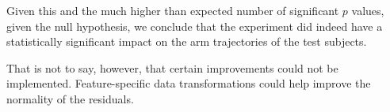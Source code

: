 \documentclass[11pt,fleqn]{article}
\begin{document}
Given this and the much higher than expected number of significant $ p $ values, given the null hypothesis, we conclude that the experiment did indeed have a statistically significant impact on the arm trajectories of the test subjects.

That is not to say, however, that certain improvements could not be implemented.
Feature-specific data transformations could help improve the normality of the residuals.

%
%
\end{document}
